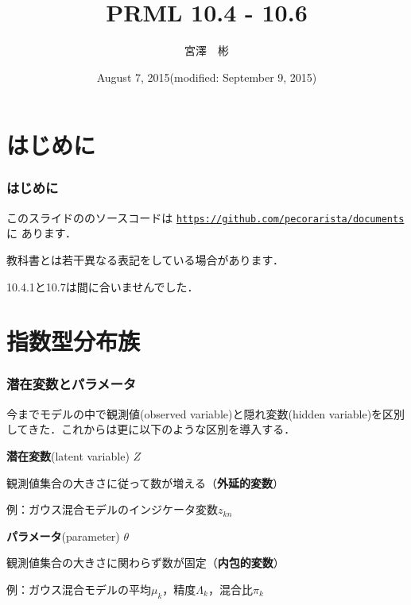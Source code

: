 \documentclass[10pt,hyperref={unicode}]{beamer}
\title{PRML 10.4 - 10.6}
\date{August 7, 2015\newline(modified: September 9, 2015)}
\institute{総合研究大学院大学 博士前期\newline\newline\texttt{miyazawa-a@nii.ac.jp}}
\author{宮澤　彬}
\newenvironment{wideitemize}{\itemize\addtolength{\itemsep}{1em}}{\enditemize}
\begin{document}
\setlength{\jot}{1.5\jot}
\nocite{bishop2008}
\begin{frame}
\maketitle
\end{frame}


\section{はじめに}

\begin{frame}
    \frametitle{はじめに}
    \begin{wideitemize}
        \item このスライドの{\LuaLaTeX}のソースコードは
            \href{https://github.com/pecorarista/documents}{\texttt{https://github.com/pecorarista/documents}}に
            あります．
        \item 教科書とは若干異なる表記をしている場合があります．
        \item 10.4.1と10.7は間に合いませんでした．
    \end{wideitemize}
\end{frame}

\section{指数型分布族}

\begin{frame}
\frametitle{潜在変数とパラメータ}
今までモデルの中で観測値(observed variable)と隠れ変数(hidden variable)を区別してきた．これからは更に以下のような区別を導入する．

\bigskip

\begin{wideitemize}
    \item \textbf{潜在変数}(latent variable) $Z$

        観測値集合の大きさに従って数が増える（\textbf{外延的変数}）

        例：ガウス混合モデルのインジケータ変数$z_{kn}$

    \item \textbf{パラメータ}(parameter) $\theta$

        観測値集合の大きさに関わらず数が固定（\textbf{内包的変数}）

        例：ガウス混合モデルの平均$\mu_k$，精度$\varLambda_k$，混合比$\pi_k$
\end{wideitemize}
\end{frame}
\end{document}
